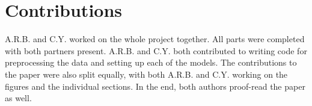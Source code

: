 
\section{Contributions}
\label{sec:contrib}

A.R.B. and C.Y. worked on the whole project together. All parts were completed with both partners present. A.R.B. and C.Y. both contributed to writing code for preprocessing the data and setting up each of the models. The contributions to the paper were also split equally, with both A.R.B. and C.Y. working on the figures and the individual sections. In the end, both authors proof-read the paper as well.

